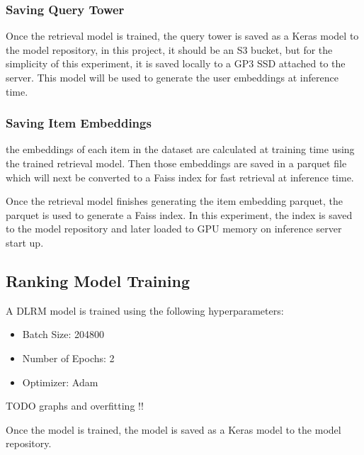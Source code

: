 \subsubsection{Saving Query Tower}

Once the retrieval model is trained, the query tower is saved as a Keras model to the model repository, 
in this project, it should be an S3 bucket, but for the simplicity of this experiment, it is saved locally to a GP3 SSD attached to the server.
This model will be used to generate the user embeddings at inference time.

\subsubsection{Saving Item Embeddings}

the embeddings of each item in the dataset are calculated at training time using the trained retrieval model. 
Then those embeddings are saved in a parquet \cite{ApacheParquet} file which will next be converted to a Faiss \cite{Faiss} index for fast retrieval at inference time.

Once the retrieval model finishes generating the item embedding parquet,
the parquet is used to generate a Faiss \cite{Faiss} index.
In this experiment, the index is saved to the model repository and later loaded to GPU memory on inference server start up.

\subsection{Ranking Model Training}

A DLRM model is trained using the following hyperparameters:

\begin{itemize}
\item Batch Size: 204800
\item Number of Epochs: 2
\item Optimizer: Adam
\end{itemize}

TODO graphs and overfitting !!

Once the model is trained, the model is saved as a Keras model to the model repository.